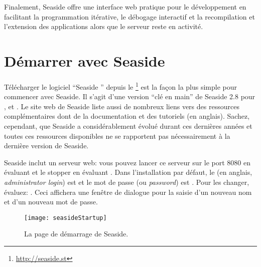\documentclass[a4paper,10pt,twoside]{book}
\begin{document}
Finalement, Seaside offre une interface web pratique pour le
développement en facilitant la programmation itérative, le débogage
interactif et la recompilation et l'extension des applications alors
que le serveur reste en activité.

\section{Démarrer avec Seaside}

Télécharger le logiciel ``Seaside '' depuis le \footnote{\url{http://seaside.st}} est la façon la plus simple
pour commencer avec Seaside.
Il s'agit d'une version ``clé en main''
de Seaside 2.8 pour ,  et .
Le site web de Seaside liste aussi de nombreux liens vers des
ressources complémentaires dont de la documentation et des
tutoriels (en anglais).
Sachez, cependant, que Seaside a considérablement évolué durant ces
dernières années et toutes ces ressources disponibles ne se rapportent
pas nécessairement à la dernière version de Seaside.


Seaside inclut un serveur web: vous pouvez lancer ce serveur sur le
port 8080 en évaluant   et le stopper
en évaluant .
Dans l'installation par défaut, le  (en anglais, \emph{administrator login}) est
 et le mot de passe (ou \emph{password}) est .
Pour les changer, évaluez: 
  .
Ceci affichera une fenêtre de dialogue pour la saisie d'un nouveau nom
et d'un nouveau mot de passe. 

\begin{figure}[tbh]
\begin{center}
\texttt{[image: seasideStartup]}
\caption{La page de démarrage de Seaside.}
\end{center}
\end{figure}
\end{document}
